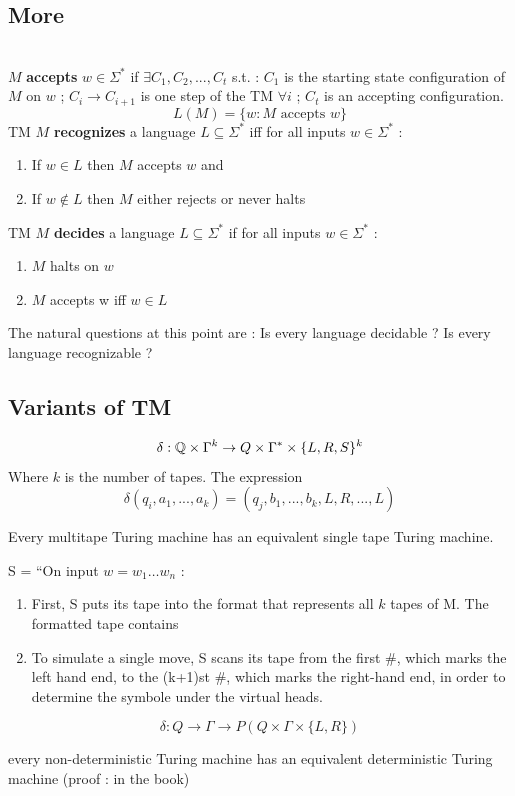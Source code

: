 \documentclass[12pt,a4paper]{article}
\newcommand{\<}{\langle}
\renewcommand{\>}{\rangle}
\begin{document}
\subsection{More}
\\
$M$ \textbf{accepts} $w \in \Sigma^*$ if $\exists C_1,C_2,...,C_t$ s.t. : $C_1$ is the starting state configuration of $M$ on $w$ ; $C_i \to C_{i+1}$ is one step of the TM $\forall i$ ; $C_t$ is an accepting configuration.
\[L(M) = \{w: M \text{ accepts }w\}\]
TM $M$ \textbf{recognizes} a language $L \subseteq \Sigma^*$ iff for all inputs $w \in \Sigma^*$ :
\begin{enumerate}
    \item If $w\in L$ then $M$ accepts $w$ and
    \item If $w \notin L$ then $M$ either rejects or never halts
\end{enumerate}
TM $M$ \textbf{decides} a language $L \subseteq \Sigma^*$ if for all inputs $w \in \Sigma^*$ :
\begin{enumerate}
    \item $M$ halts on $w$
    \item $M$ accepts w iff $w \in L$
\end{enumerate}
The natural questions at this point are : Is every language decidable ? Is every language recognizable ?
\subsection{Variants of TM}
\[\delta : \mathbb{Q} \times \Gamma^k \to Q \times \Gamma^* \times \{L,R,S\}^k\]
Where $k$ is the number of tapes. The expression
\[\delta(q_i,a_1,...,a_k) = (q_j,b_1,...,b_k,L,R,...,L)\]
\begin{boite}
     Every multitape Turing machine has an equivalent single tape Turing machine.
\end{boite}
S = ``On input $w = w_1\ldots w_n$ : 
\begin{enumerate}
    \item First, S puts its tape into the format that represents all $k$ tapes of M. The formatted tape contains 
    \item To simulate a single move, S scans its tape from the first \#, which marks the left hand end, to the (k+1)st \#, which marks the right-hand end, in order to determine the symbole under the virtual heads. 
\end{enumerate}
\[\delta : Q \to \Gamma \to P(Q\times \Gamma \times \{L,R\})\]
\begin{boite}
     every non-deterministic Turing machine has an equivalent deterministic Turing machine (proof : in the book)
\end{boite}
\end{document}
